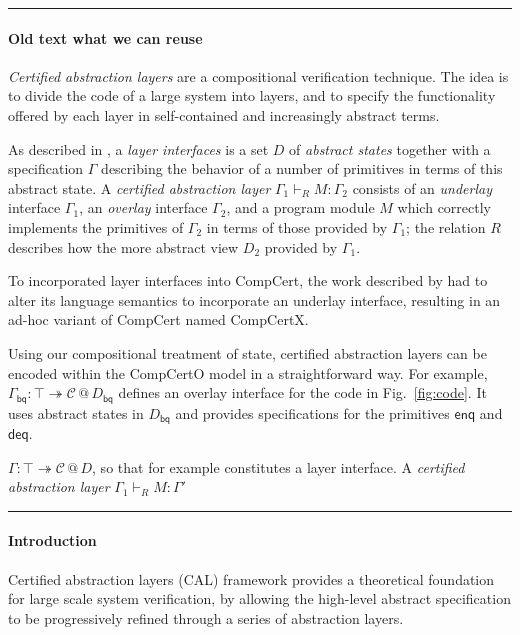 \documentclass[acmsmall,screen,review,anonymous]{acmart}
\newcommand{\kw}[1]{\ensuremath{ \mathsf{#1} }}
\begin{document}
\hrule

\paragraph{Old text what we can reuse}

\emph{Certified abstraction layers}
are a compositional verification technique.
The idea is to divide the code of a large system into layers,
and to specify the functionality offered by each layer
in self-contained and increasingly abstract terms.

As described in \citet{popl15},
a \emph{layer interfaces} is
a set $D$ of \emph{abstract states}
together with a specification $\Gamma$
describing the behavior of a number of primitives
in terms of this abstract state.
A \emph{certified abstraction layer}
$\Gamma_1 \vdash_R M : \Gamma_2$
consists of an \emph{underlay} interface $\Gamma_1$,
an \emph{overlay} interface $\Gamma_2$,
and a program module $M$
which correctly implements the primitives of $\Gamma_2$
in terms of those provided by $\Gamma_1$;
the relation $R$ describes
how the more abstract view $D_2$ provided by $\Gamma_1$.

To incorporated layer interfaces into CompCert,
the work described by \citet{popl15}
had to alter its language semantics
to incorporate an underlay interface,
resulting in an ad-hoc variant of CompCert named CompCertX.

Using our compositional treatment of state,
certified abstraction layers can be encoded
within the CompCertO model
in a straightforward way.
For example,
$\Gamma_\kw{bq} : \top \twoheadrightarrow \mathcal{C} \mathbin@ D_\kw{bq}$
defines an overlay interface for the code in Fig.~\ref{fig:code}.
It uses abstract states in $D_\kw{bq}$
and provides specifications for the primitives $\kw{enq}$ and $\kw{deq}$.

$\Gamma : \top \twoheadrightarrow \mathcal{C} \mathbin@ D$,
so that for example
constitutes a layer interface.
A \emph{certified abstraction layer}
$\Gamma_1 \vdash_R M : \Gamma'$

\hrule

\paragraph{Introduction}
Certified abstraction layers (CAL) framework
provides a theoretical foundation
for large scale system verification,
by allowing
the high-level abstract specification
to be progressively refined
through a series of abstraction layers.
\end{document}
